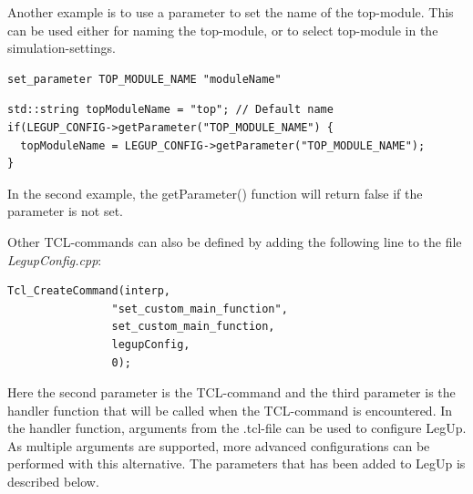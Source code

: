 Another example is to use a parameter to set the name of the top-module. This can be used either for naming the top-module, or to select top-module in the simulation-settings. 
\begin{verbatim}
set_parameter TOP_MODULE_NAME "moduleName"
\end{verbatim}
\begin{lstlisting}
std::string topModuleName = "top"; // Default name
if(LEGUP_CONFIG->getParameter("TOP_MODULE_NAME") {
  topModuleName = LEGUP_CONFIG->getParameter("TOP_MODULE_NAME");
}
\end{lstlisting}
In the second example, the getParameter() function will return false if the parameter is not set.

Other TCL-commands can also be defined by adding the following line to the file \textit{LegupConfig.cpp}:
\begin{lstlisting}
Tcl_CreateCommand(interp,
                "set_custom_main_function",
                set_custom_main_function,
                legupConfig,
                0);
\end{lstlisting}
Here the second parameter is the TCL-command and the third parameter is the handler function that will be called when the TCL-command is encountered. In the handler function, arguments from the .tcl-file can be used to configure LegUp. As multiple arguments are supported, more advanced configurations can be performed with this alternative. The parameters that has been added to LegUp is described below.

